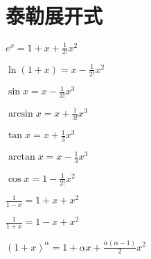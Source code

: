 \section{泰勒展开式}

\begin{multicols}{2}
    \begin{spacing}{\hangju}
        \noindent $e^x = 1 + x + \frac{1}{2!}x^2$

        \noindent $\ln{(1 + x)} = x - \frac{1}{2!}x^2$

        \noindent $\sin{x} = x - \frac{1}{3!}x^{3}$

        \noindent $\arcsin{x} = x + \frac{1}{3!}x^{3}$

        \noindent $\tan{x} = x + \frac{1}{3}x^3$

        \noindent $\arctan{x} = x - \frac{1}{3}x^3$

        \noindent $\cos{x} = 1 - \frac{1}{2!}x^2$

        \noindent $\frac{1}{1 - x} = 1 + x + x^2$

        \noindent $\frac{1}{1 + x} = 1 - x + x^2$

        \noindent $(1 + x)^\alpha = 1 + \alpha x + \frac{\alpha(\alpha - 1)}{2}x^2$
    \end{spacing}
\end{multicols}